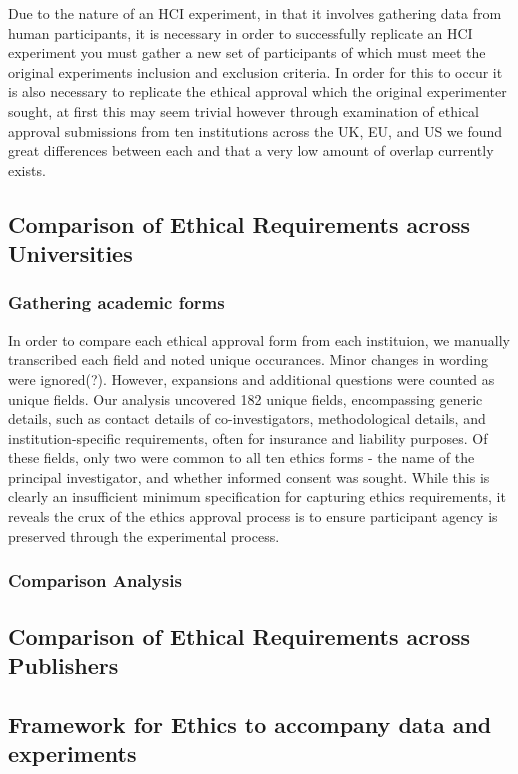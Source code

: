 Due to the nature of an HCI experiment, in that it involves gathering data from human participants, it is necessary in order to successfully replicate an HCI experiment you must gather a new set of participants of which must meet the original experiments inclusion and exclusion criteria. In order for this to occur it is also necessary to replicate the ethical approval which the original experimenter sought, at first this may seem trivial however through examination of ethical approval submissions from ten institutions across the UK, EU, and US we found great differences between each and that a very low amount of overlap currently exists.

\subsection{Comparison of Ethical Requirements across Universities}

\subsubsection{Gathering academic forms}




In order to compare each ethical approval form from each instituion, we manually transcribed each field and noted unique occurances. Minor changes in wording were ignored(?). However, expansions and additional questions were counted as unique fields. Our analysis uncovered 182 unique fields, encompassing generic details, such as contact details of co-investigators, methodological details, and institution-specific requirements, often for insurance and liability purposes. Of these fields, only two were common to all ten ethics forms - the name of the principal investigator, and whether informed consent was sought. While this is clearly an insufficient  minimum specification for capturing ethics requirements, it reveals the crux of the ethics approval process is to ensure participant agency is preserved through the experimental process.

\subsubsection{Comparison Analysis}












\subsection{Comparison of Ethical Requirements across Publishers}

\subsection{Framework for Ethics to accompany data and experiments}

